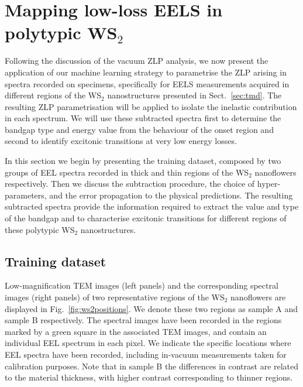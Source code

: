 \section{Mapping low-loss EELS in polytypic WS$_2$}
\label{sec:results_sample}

Following the discussion of the vacuum ZLP analysis, we now
present the application of our machine learning strategy to parametrise the ZLP
arising in spectra recorded on specimens, specifically for
EELS measurements acquired in different regions
of the WS$_2$ nanostructures presented in Sect.~\ref{sec:tmd}.
%
The resulting ZLP parametrisation will be applied to isolate the inelastic
contribution in each spectrum.
%
We will use these subtracted spectra first to determine the bandgap type and energy 
value from the behaviour of the onset region and second to identify excitonic
transitions at very low energy losses.

In this section we begin by presenting the training dataset, composed by two groups of EEL spectra recorded
in thick and thin regions of the WS$_2$  nanoflowers respectively.
%
Then we discuss the subtraction procedure, the choice of hyper-parameters, and the error propagation
to the physical predictions.
%
The resulting subtracted spectra provide the information
required to extract the value and type of the bandgap
and to characterise excitonic transitions for different regions of these polytypic WS$_2$ nanostructures.

\subsection{Training dataset}

Low-magnification TEM images (left panels) and the corresponding
spectral images (right panels) of two representative regions of
the WS$_2$ nanoflowers are displayed in Fig.~\ref{fig:ws2positions}.
%
We denote these two regions as sample A and sample B respectively.
%
The spectral images have been recorded in the regions marked by a green square
    in the associated TEM images, and contain an individual EEL spectrum in each pixel.
%
We indicate the specific locations where
EEL spectra have been recorded, including in-vacuum measurements taken
for calibration purposes.
%
Note that in sample B  the differences in contrast are related to the material
thickness, with higher contrast corresponding to thinner regions.

